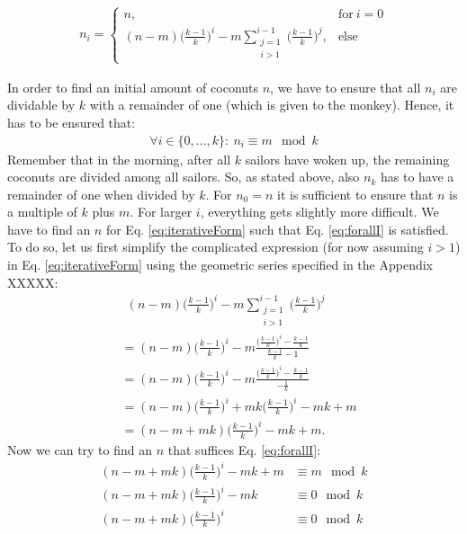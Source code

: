 \documentclass[11pt]{article}
\begin{document}
\begin{align}
	n_i=\begin{cases} 
		n, & \mbox{for} \ i=0 \\ 
		(n-m)\bigg(\frac{k-1}{k} \bigg)^i - m\sum\limits_{\substack{j=1 \\ i>1}}^{i-1}\bigg(\frac{k-1}{k} \bigg)^j, & \mbox{else}
	\end{cases}
	\label{eq:iterativeForm}
\end{align}

In order to find an initial amount of coconuts $n$, we have to ensure that all $n_i$ are dividable by $k$ with a remainder of one (which is given to the monkey). Hence, it has to be ensured that:
\begin{align}
	\forall i \in \{ 0, \ldots, k\}: \ n_i \equiv m\mod k
	\label{eq:forallI}
\end{align}
Remember that in the morning, after all $k$ sailors have woken up, the remaining coconuts are divided among all sailors. So, as stated above, also $n_k$ has to have a remainder of one when divided by $k$. For $n_0=n$ it is sufficient to ensure that $n$ is a multiple of $k$ plus $m$. For larger $i$, everything gets slightly more difficult. We have to find an $n$ for Eq. \eqref{eq:iterativeForm} such that Eq. \eqref{eq:forallI} is satisfied. To do so, let us first simplify the complicated expression (for now assuming $i>1$) in Eq. \eqref{eq:iterativeForm} using the geometric series specified in the Appendix XXXXX:
\begin{align}
	& \ \ (n-m)\bigg(\frac{k-1}{k} \bigg)^i - m\sum\limits_{\substack{j=1 \\ i>1}}^{i-1}\bigg(\frac{k-1}{k} \bigg)^j \label{eq:probWithSum} \\
	&= (n-m)\bigg(\frac{k-1}{k} \bigg)^i - m\frac{ \Big(\frac{k-1}{k}\Big)^i - \frac{k-1}{k}}{\frac{k-1}{k} - 1} \\
	&= (n-m)\bigg(\frac{k-1}{k} \bigg)^i - m\frac{ \Big(\frac{k-1}{k}\Big)^i - \frac{k-1}{k}}{-\frac{1}{k}} \\
	&= (n-m)\bigg(\frac{k-1}{k} \bigg)^i + mk \bigg(\frac{k-1}{k} \bigg)^i-mk+m \\
	&= (n-m+mk)\bigg(\frac{k-1}{k} \bigg)^i -mk+m. \label{eq:iterativeSimple}
\end{align}
Now we can try to find an $n$ that suffices Eq. \eqref{eq:forallI}:
\begin{align}
(n-m+mk)\bigg(\frac{k-1}{k} \bigg)^i -mk+m &\equiv m \mod k \\
(n-m+mk)\bigg(\frac{k-1}{k} \bigg)^i -mk &\equiv 0 \mod k \\
(n-m+mk)\bigg(\frac{k-1}{k} \bigg)^i &\equiv 0 \mod k \label{eq:modulo}
\end{align}
\end{document}
